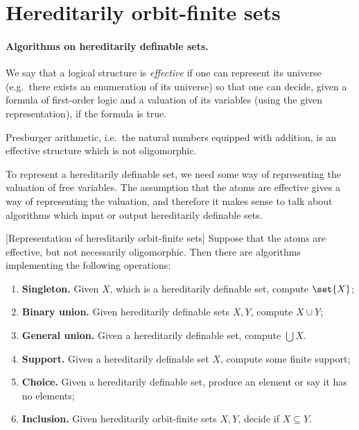 \section{Hereditarily orbit-finite sets}



\paragraph*{Algorithms on hereditarily definable sets.}
 We say that a logical structure is \emph{effective} if one can represent its universe (e.g.~there exists an enumeration of its universe) so that one can decide, given a formula of first-order logic and a valuation of its variables (using the given representation), if the formula is true. 
 
 \begin{ourexample}
 	Presburger arithmetic, i.e.~the natural numbers equipped with addition, is an effective structure which is not oligomorphic.
 \end{ourexample}


 To represent a hereditarily definable set, we need some way of representing the valuation of free variables. The assumption that the atoms are effective gives a way of representing the valuation, and therefore it makes sense to talk about algorithms which input or output hereditarily definable sets.
 
 
 
 \begin{theorem}\label{thm:atom-toolkit}[Representation of hereditarily orbit-finite sets]
 	Suppose that the atoms are effective, but not necessarily oligomorphic. Then there are algorithms implementing the following operations:
 		\begin{enumerate}
 			\item \label{atom-toolikt-singleton} {\bf Singleton.} Given $X$, which is a hereditarily definable set, compute $\set{X}$;
 			\item \label{atom-toolikt-union} {\bf Binary union.} Given hereditarily definable sets $X, Y$, compute $X \cup Y$;
			\item \label{atom-toolkit-big-union} {\bf General union. } Given a hereditarily definable set, compute $\bigcup X$.
 			\item \label{atom-toolikt-support} {\bf Support.} Given a hereditarily definable set $X$, compute some finite support; 
 			\item \label{atom-toolikt-element} {\bf Choice.} Given a hereditarily definable set, produce an element or say it has no elements;
 				\item \label{atom-toolikt-equality} {\bf Inclusion.} Given hereditarily orbit-finite sets $X,Y$, decide if $X \subseteq Y$.
 		\end{enumerate} 
 \end{theorem}
 
